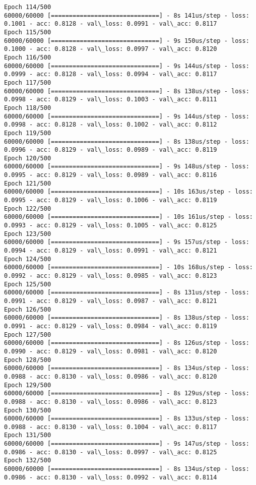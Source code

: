 \documentclass[11pt]{article}
\begin{document}
\begin{Verbatim}[commandchars=\\\{\}]
Epoch 114/500
60000/60000 [==============================] - 8s 141us/step - loss: 0.1001 - acc: 0.8128 - val\_loss: 0.0991 - val\_acc: 0.8117
Epoch 115/500
60000/60000 [==============================] - 9s 150us/step - loss: 0.1000 - acc: 0.8128 - val\_loss: 0.0997 - val\_acc: 0.8120
Epoch 116/500
60000/60000 [==============================] - 9s 144us/step - loss: 0.0999 - acc: 0.8128 - val\_loss: 0.0994 - val\_acc: 0.8117
Epoch 117/500
60000/60000 [==============================] - 8s 138us/step - loss: 0.0998 - acc: 0.8129 - val\_loss: 0.1003 - val\_acc: 0.8111
Epoch 118/500
60000/60000 [==============================] - 9s 144us/step - loss: 0.0998 - acc: 0.8128 - val\_loss: 0.1002 - val\_acc: 0.8112
Epoch 119/500
60000/60000 [==============================] - 8s 138us/step - loss: 0.0996 - acc: 0.8129 - val\_loss: 0.0989 - val\_acc: 0.8119
Epoch 120/500
60000/60000 [==============================] - 9s 148us/step - loss: 0.0995 - acc: 0.8129 - val\_loss: 0.0989 - val\_acc: 0.8116
Epoch 121/500
60000/60000 [==============================] - 10s 163us/step - loss: 0.0995 - acc: 0.8129 - val\_loss: 0.1006 - val\_acc: 0.8119
Epoch 122/500
60000/60000 [==============================] - 10s 161us/step - loss: 0.0993 - acc: 0.8129 - val\_loss: 0.1005 - val\_acc: 0.8125
Epoch 123/500
60000/60000 [==============================] - 9s 157us/step - loss: 0.0994 - acc: 0.8129 - val\_loss: 0.0991 - val\_acc: 0.8121
Epoch 124/500
60000/60000 [==============================] - 10s 168us/step - loss: 0.0992 - acc: 0.8129 - val\_loss: 0.0985 - val\_acc: 0.8123
Epoch 125/500
60000/60000 [==============================] - 8s 131us/step - loss: 0.0991 - acc: 0.8129 - val\_loss: 0.0987 - val\_acc: 0.8121
Epoch 126/500
60000/60000 [==============================] - 8s 138us/step - loss: 0.0991 - acc: 0.8129 - val\_loss: 0.0984 - val\_acc: 0.8119
Epoch 127/500
60000/60000 [==============================] - 8s 126us/step - loss: 0.0990 - acc: 0.8129 - val\_loss: 0.0981 - val\_acc: 0.8120
Epoch 128/500
60000/60000 [==============================] - 8s 134us/step - loss: 0.0988 - acc: 0.8130 - val\_loss: 0.0986 - val\_acc: 0.8120
Epoch 129/500
60000/60000 [==============================] - 8s 129us/step - loss: 0.0988 - acc: 0.8130 - val\_loss: 0.0986 - val\_acc: 0.8123
Epoch 130/500
60000/60000 [==============================] - 8s 133us/step - loss: 0.0988 - acc: 0.8130 - val\_loss: 0.1004 - val\_acc: 0.8117
Epoch 131/500
60000/60000 [==============================] - 9s 147us/step - loss: 0.0986 - acc: 0.8130 - val\_loss: 0.0997 - val\_acc: 0.8125
Epoch 132/500
60000/60000 [==============================] - 8s 134us/step - loss: 0.0986 - acc: 0.8130 - val\_loss: 0.0992 - val\_acc: 0.8114

\end{Verbatim}
\end{document}
